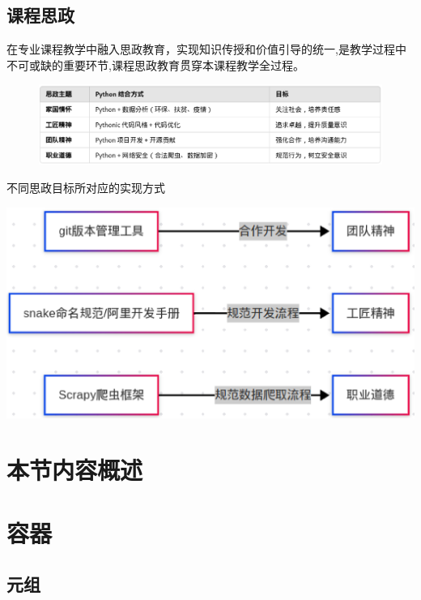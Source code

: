 \documentclass{beamer}
\begin{document}
\subsection{课程思政}

\begin{frame}[t]
	在专业课程教学中融入思政教育，实现知识传授和价值引导的统一,是教学过程中不可或缺的重要环节,课程思政教育贯穿本课程教学全过程。
	\begin{figure}[htbp]
		\begin{center}
			\includegraphics[width=0.9\linewidth]{policy.eps}
		\end{center}
	\end{figure}
	\pause
	不同思政目标所对应的实现方式
	\begin{center}
		\includegraphics[width=0.5\linewidth]{tools_for_policy.eps}
	\end{center}
\end{frame}


\section{本节内容概述}



\section{容器}

\subsection{元组}
\end{document}
